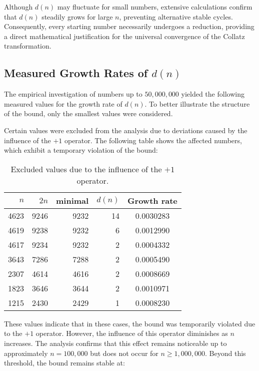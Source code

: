 \documentclass[a4paper,12pt]{article}
\begin{document}
Although \( d(n) \) may fluctuate for small numbers, extensive calculations confirm that \( d(n) \) steadily grows for large \( n \), preventing alternative stable cycles. Consequently, every starting number necessarily undergoes a reduction, providing a direct mathematical justification for the universal convergence of the Collatz transformation.



\subsection{Measured Growth Rates of \( d(n) \)}

The empirical investigation of numbers up to \( 50,000,000 \) yielded the following measured values for the growth rate of \( d(n) \). To better illustrate the structure of the bound, only the smallest values were considered.

Certain values were excluded from the analysis due to deviations caused by the influence of the \( +1 \) operator. The following table shows the affected numbers, which exhibit a temporary violation of the bound:

\begin{table}[h]
    \centering
    \begin{tabular}{|r|r|r|r|c|}
        \hline
        \( n \) & \( 2n \) & minimal & \( d(n) \) & Growth rate \\
        \hline
        4623  & 9246  & 9232  & 14  & 0.0030283 \\
        4619  & 9238  & 9232  & 6   & 0.0012990 \\
        4617  & 9234  & 9232  & 2   & 0.0004332 \\
        3643  & 7286  & 7288  & 2   & 0.0005490 \\
        2307  & 4614  & 4616  & 2   & 0.0008669 \\
        1823  & 3646  & 3644  & 2   & 0.0010971 \\
        1215  & 2430  & 2429  & 1   & 0.0008230 \\
        \hline
    \end{tabular}
    \caption{Excluded values due to the influence of the \( +1 \) operator.}
\end{table}

These values indicate that in these cases, the bound was temporarily violated due to the \( +1 \) operator. However, the influence of this operator diminishes as \( n \) increases. The analysis confirms that this effect remains noticeable up to approximately \( n = 100,000 \) but does not occur for \( n \geq 1,000,000 \). Beyond this threshold, the bound remains stable at:
\end{document}
